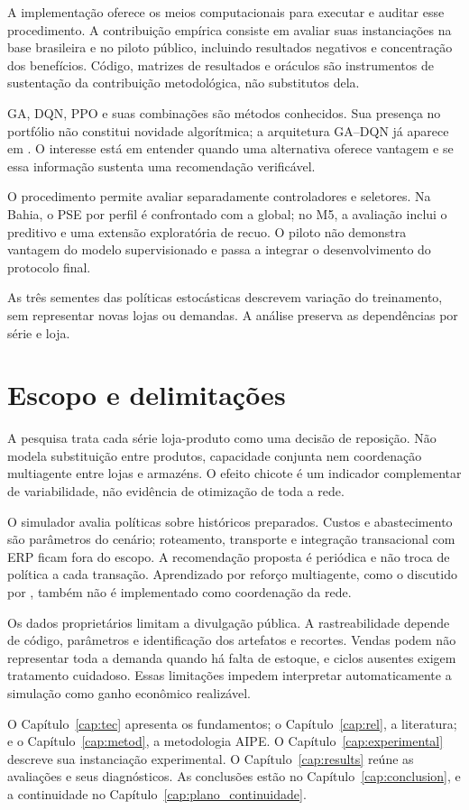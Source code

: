 A implementação oferece os meios computacionais para executar e auditar esse procedimento. A contribuição empírica consiste em avaliar suas instanciações na base brasileira e no piloto público, incluindo resultados negativos e concentração dos benefícios. Código, matrizes de resultados e oráculos são instrumentos de sustentação da contribuição metodológica, não substitutos dela.

GA, DQN, PPO e suas combinações são métodos conhecidos. Sua presença no portfólio não constitui novidade algorítmica; a arquitetura GA--DQN já aparece em \citet{Zabraoui2025GaDQN}. O interesse está em entender quando uma alternativa oferece vantagem e se essa informação sustenta uma recomendação verificável.

O procedimento permite avaliar separadamente controladores e seletores. Na Bahia, o PSE por perfil é confrontado com a global; no M5, a avaliação inclui o preditivo e uma extensão exploratória de recuo. O piloto não demonstra vantagem do modelo supervisionado e passa a integrar o desenvolvimento do protocolo final.

As três sementes das políticas estocásticas descrevem variação do treinamento, sem representar novas lojas ou demandas. A análise preserva as dependências por série e loja.

\section{Escopo e delimitações}
\label{sec:delimitacoes}

A pesquisa trata cada série loja-produto como uma decisão de reposição. Não modela substituição entre produtos, capacidade conjunta nem coordenação multiagente entre lojas e armazéns. O efeito chicote é um indicador complementar de variabilidade, não evidência de otimização de toda a rede.

O simulador avalia políticas sobre históricos preparados. Custos e abastecimento são parâmetros do cenário; roteamento, transporte e integração transacional com ERP ficam fora do escopo. A recomendação proposta é periódica e não troca de política a cada transação. Aprendizado por reforço multiagente, como o discutido por \citet{Liu2024HAPPO}, também não é implementado como coordenação da rede.

Os dados proprietários limitam a divulgação pública. A rastreabilidade depende de código, parâmetros e identificação dos artefatos e recortes. Vendas podem não representar toda a demanda quando há falta de estoque, e ciclos ausentes exigem tratamento cuidadoso. Essas limitações impedem interpretar automaticamente a simulação como ganho econômico realizável.

O Capítulo~\ref{cap:tec} apresenta os fundamentos; o Capítulo~\ref{cap:rel}, a literatura; e o Capítulo~\ref{cap:metod}, a metodologia AIPE. O Capítulo~\ref{cap:experimental} descreve sua instanciação experimental. O Capítulo~\ref{cap:results} reúne as avaliações e seus diagnósticos. As conclusões estão no Capítulo~\ref{cap:conclusion}, e a continuidade no Capítulo~\ref{cap:plano_continuidade}.

\newpage\lhead{\rightmark}
